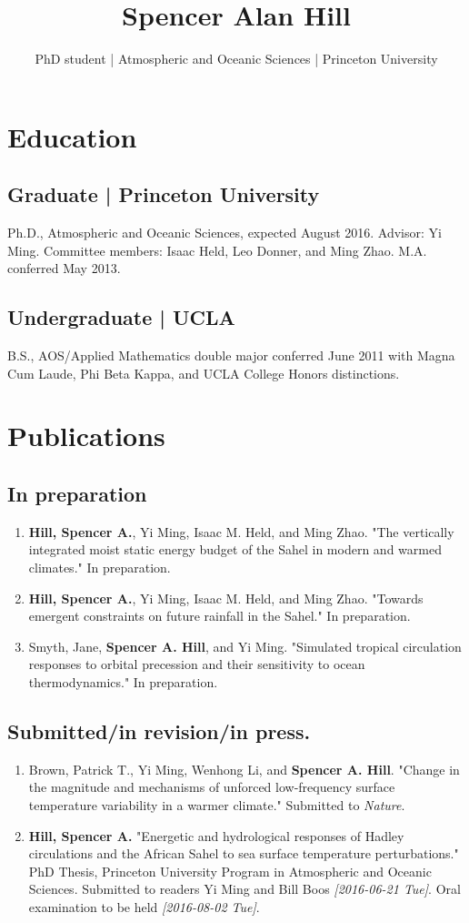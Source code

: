 \documentclass{article}
\author{PhD student | Atmospheric and Oceanic Sciences | Princeton University}
\date{}
\title{Spencer Alan Hill}
\begin{document}
\maketitle
\section*{Education}
\label{sec:orgheadline3}
\subsection*{Graduate | Princeton University}
\label{sec:orgheadline1}
Ph.D., Atmospheric and Oceanic Sciences, expected August 2016.  Advisor: Yi
Ming.  Committee members: Isaac Held, Leo Donner, and Ming Zhao.
M.A. conferred May 2013.
\subsection*{Undergraduate | UCLA}
\label{sec:orgheadline2}
B.S., AOS/Applied Mathematics double major conferred June 2011 with
Magna Cum Laude, Phi Beta Kappa, and UCLA College Honors distinctions.
\section*{Publications}
\label{sec:orgheadline8}
\subsection*{In preparation}
\label{sec:orgheadline4}
\begin{enumerate}
\item \textbf{Hill, Spencer A.}, Yi Ming, Isaac M. Held, and Ming Zhao.  "The vertically
integrated moist static energy budget of the Sahel in modern and warmed
climates."  In preparation.
\item \textbf{Hill, Spencer A.}, Yi Ming, Isaac M. Held, and Ming Zhao.  "Towards emergent constraints on
future rainfall in the Sahel."  In preparation.
\item Smyth, Jane, \textbf{Spencer A. Hill}, and Yi Ming.  "Simulated tropical circulation responses to
orbital precession and their sensitivity to ocean thermodynamics."  In
preparation.
\end{enumerate}
\subsection*{Submitted/in revision/in press.}
\label{sec:orgheadline5}
\begin{enumerate}
\item Brown, Patrick T., Yi Ming, Wenhong Li, and \textbf{Spencer A. Hill}.  "Change in the
magnitude and mechanisms of unforced low-frequency surface temperature
variability in a warmer climate."  Submitted to \emph{Nature}.
\item \textbf{Hill, Spencer A.} "Energetic and hydrological responses of Hadley circulations
and the African Sahel to sea surface temperature perturbations."  PhD Thesis,
Princeton University Program in Atmospheric and Oceanic Sciences.  Submitted
to readers Yi Ming and Bill Boos \textit{[2016-06-21 Tue]}.  Oral examination to be
held \textit{[2016-08-02 Tue]}.
\end{enumerate}
\end{document}
